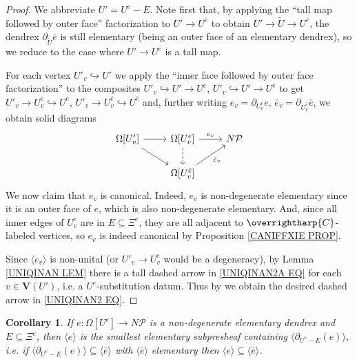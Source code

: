 \documentclass[a4paper,10pt
,draft
]{article}%
\numberwithin{equation}{section}
\numberwithin{figure}{section}
\newtheorem{corollary}[equation]{Corollary}%
\theoremstyle{definition} %
\newcommand{\vect}[1]{\text{\overrightharp{\ensuremath{#1}}}}
\newcommand{\1}{\ensuremath{\mathbbm 1}}%
\begin{document}
\begin{proof}
	We abbreviate $U' = U^e -E$. 
	Note first that, 
	by applying the
	``tall map followed by outer face'' factorization to
	$U' \to U^{\bar{e}}$
	to obtain
	$U' \to \tilde{U} \to U^{\bar{e}}$,
	the dendrex $\partial_{\tilde{U}} \bar{e}$
	is still elementary (being an outer face of an elementary dendrex),
	so we reduce to the case where $U' \to U^{\bar{e}}$ is a tall map.
	
	For each vertex $U'_v \hookrightarrow U'$ we apply the 
	``inner face followed by outer face factorization''
	to the composites
	$U'_{v} \hookrightarrow U' \to U^{e}$,
	$U'_{v} \hookrightarrow U' \to U^{\bar{e}}$
	to get
	$U'_{v} \to U_{v}^e \hookrightarrow U^e$,
	$U'_{v} \to U_{v}^{\bar{e}} \hookrightarrow U^{\bar{e}}$
	and, further writing
	$e_v = \partial_{U^e_v} e$,
	$\bar{e}_v = \partial_{U^{\bar{e}}_v} \bar{e}$, 
	we obtain solid diagrams
	\begin{equation}\label{UNIQINAN2A EQ}
	\begin{tikzcd}
	\Omega[U'_v] \ar{r} \ar{rd}&
	\Omega[U^e_v] \ar{r}{e_v} \ar[dashed]{d} &
	N \mathcal{P}
	\\
	&
	\Omega[U^{\bar{e}}_v] \ar{ru}[swap]{\bar{e}_v} 
	\end{tikzcd}
	\end{equation}
	We now claim that $e_v$ is canonical. Indeed, $e_v$ is non-degenerate elementary since it is an outer face of $e$, which is also non-degenerate elementary. 
	And, since all inner edges of $U^e_v$ are in 
	$E \subseteq \Xi^e$, they are all adjacent to $\vect{C}$-labeled vertices, 
	so $e_v$
	is indeed canonical by
	Proposition \ref{CANIFFXIE PROP}.
	
	
	Since $\langle e_v \rangle$ is non-unital
	(or $U'_v \to U_v^e$ would be a degeneracy),
	by Lemma \ref{UNIQINAN LEM} there is a tall dashed arrow in \eqref{UNIQINAN2A EQ} for each $v \in \boldsymbol{V}(U')$,
	i.e. a $U^e$-substitution datum. Thus
	by
	\cite[Prop. 3.46]{BP_geo}
	we obtain the desired dashed arrow in \eqref{UNIQINAN2 EQ}.
\end{proof}



\begin{corollary}\label{MINELEMSH COR}
	If $e \colon \Omega[U^e] \to N \mathcal{P}$ is a non-degenerate elementary dendrex
	and $E \subseteq \Xi^e$,
	then 
	$\langle e\rangle$ is the smallest elementary subpresheaf
	containing $\langle \partial_{U^e - E} (e)\rangle$,
	i.e. if 
	$\langle \partial_{U^e - E} (e)\rangle
	\subseteq \langle \bar{e} \rangle$
	with $\langle \bar{e} \rangle$
	elementary then 
	$\langle e\rangle
	\subseteq \langle \bar{e} \rangle$.
\end{corollary}
\end{document}
